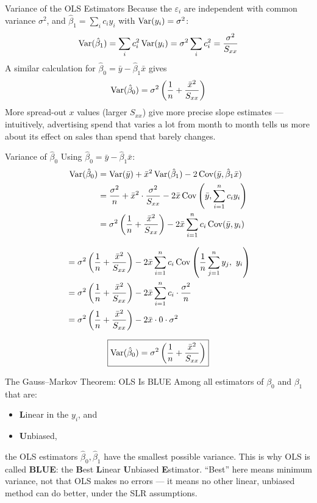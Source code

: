 \begin{frame}{Variance of the OLS Estimators}
	Because the $\varepsilon_i$ are independent with common variance $\sigma^2$, and $\hat\beta_1 = \sum_i c_i y_i$ with $\operatorname{Var}(y_i) = \sigma^2$:
	\[
		\operatorname{Var}(\hat\beta_1) = \sum_i c_i^2 \operatorname{Var}(y_i) = \sigma^2 \sum_i c_i^2 = \frac{\sigma^2}{S_{xx}}
	\]
	\pause
	A similar calculation for $\hat\beta_0 = \bar y - \hat\beta_1 \bar x$ gives
	\[
		\operatorname{Var}(\hat\beta_0) = \sigma^2\left(\frac{1}{n} + \frac{\bar x^2}{S_{xx}}\right)
	\]
	\pause
	More spread-out $x$ values (larger $S_{xx}$) give more precise slope estimates --- intuitively, advertising spend that varies a lot from month to month tells us more about its effect on sales than spend that barely changes.
\end{frame}


\begin{frame}{Variance of $\hat\beta_0$}
	Using $\hat\beta_0 = \bar y - \hat\beta_1\bar x$:
	\begin{align*}
		\operatorname{Var}(\hat\beta_0) &= \operatorname{Var}(\bar y) + \bar x^2\operatorname{Var}(\hat\beta_1) - 2\operatorname{Cov}(\bar y, \hat\beta_1 \bar x) \\
		&= \frac{\sigma^2}{n} + \bar x^2\cdot\frac{\sigma^2}{S_{xx}} - 2\bar x\operatorname{Cov}\left(\bar y, \sum_{i=1}^n c_i y_i\right) \\
		&= \sigma^2\left(\frac{1}{n} + \frac{\bar x^2}{S_{xx}}\right) - 2\bar x\sum_{i=1}^n c_i\operatorname{Cov}(\bar y, y_i)
	\end{align*}
	
\end{frame}


\begin{frame}
	\begin{align*}
		&= \sigma^2\left(\frac{1}{n} + \frac{\bar x^2}{S_{xx}}\right) - 2\bar x\sum_{i=1}^n c_i\operatorname{Cov}\left(\frac{1}{n}\sum_{j=1}^n y_j,\ y_i\right) \\
		&= \sigma^2\left(\frac{1}{n} + \frac{\bar x^2}{S_{xx}}\right) - 2\bar x\sum_{i=1}^n c_i\cdot\frac{\sigma^2}{n} \\
		&= \sigma^2\left(\frac{1}{n} + \frac{\bar x^2}{S_{xx}}\right) - 2\bar x\cdot 0\cdot\sigma^2
	\end{align*}

	\pause
	\[
		\boxed{\operatorname{Var}(\hat\beta_0) = \sigma^2\left(\frac{1}{n} + \frac{\bar x^2}{S_{xx}}\right)}
	\]
\end{frame}


\begin{frame}{The Gauss--Markov Theorem: OLS Is BLUE}
	Among all estimators of $\beta_0$ and $\beta_1$ that are:
	\begin{itemize}
		\item \textbf{L}inear in the $y_i$, and
		\item \textbf{U}nbiased,
	\end{itemize}
	the OLS estimators $\hat\beta_0, \hat\beta_1$ have the smallest possible variance.
	\svspace{0.5em}
	\pause
	This is why OLS is called \textbf{BLUE}: the \textbf{B}est \textbf{L}inear \textbf{U}nbiased \textbf{E}stimator. ``Best'' here means minimum variance, not that OLS makes no errors --- it means no other linear, unbiased method can do better, under the SLR assumptions.
\end{frame}


